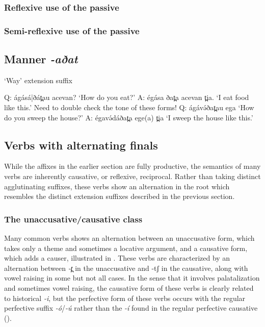 \subsubsection{Reflexive use of the passive}


\subsubsection{Semi-reflexive use of the passive}



\subsection{Manner \textit{-aðat}}

‘Way’ extension suffix

Q: ágásá|ðát̪au acevan?		‘How do you eat?’
A: égása ðat̪a acevan t̪ia.		‘I eat food like this.’
		Need to double check the tone of these forms!
Q: ágávə́ðat̪au ega			‘How do you sweep the house?’
A: égavə́dáðat̪a ege(a) t̪ia		‘I sweep the house like this.’


\subsection{Verbs with alternating finals}

While the affixes in the earlier section are fully productive, the semantics of many verbs are inherently causative, or reflexive, reciprocal. Rather than taking distinct agglutinating suffixes, these verbs show an alternation in the root which resembles the distinct extension suffixes described in the previous section. %


\subsubsection{The unaccusative/causative class}\label{sec:ch11:ucalt}

Many common verbs shows an alternation between an unaccusative form, which takes only a theme and sometimes a locative argument, and a causative form, which adds a causer, illustrated in . These verbs are characterized by an alternation between \textit{-t̪ } in the unaccusative and {-tʃ} in the causative, along with vowel raising in some but not all cases. In the sense that it involves palatalization and sometimes vowel raising, the causative form of these verbs is clearly related to historical \textit{-i}, but the perfective form of these verbs occurs with the regular perfective suffix \textit{-ó}/\textit{-ú} rather than the \textit{-í} found in the regular perfective causative (). 

